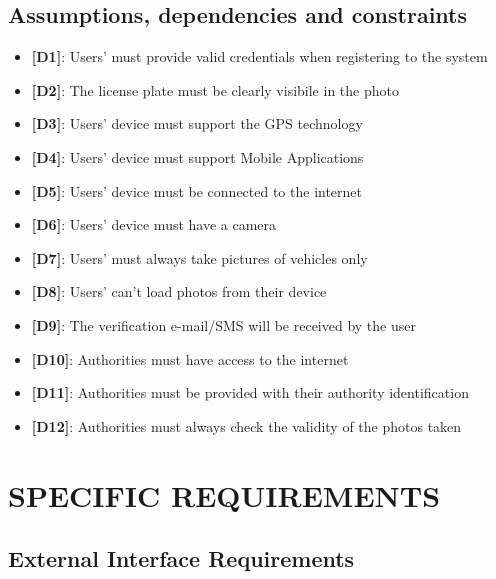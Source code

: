\documentclass[12pt,a4paper]{article}
\begin{document}
\subsection{Assumptions, dependencies and constraints}
 \begin{itemize}
				\item {\textbf[}\textbf{D1}{\textbf]}: Users' must provide valid credentials when registering to the system
				\item {\textbf[}\textbf{D2}{\textbf]}: The license plate must be clearly visibile in the photo
				\item {\textbf[}\textbf{D3}{\textbf]}: Users' device must support the GPS technology
				\item {\textbf[}\textbf{D4}{\textbf]}: Users' device must support Mobile Applications
				\item {\textbf[}\textbf{D5}{\textbf]}: Users' device must be connected to the internet
				\item {\textbf[}\textbf{D6}{\textbf]}: Users' device must have a camera
				\item {\textbf[}\textbf{D7}{\textbf]}: Users' must always take pictures of vehicles only
				\item {\textbf[}\textbf{D8}{\textbf]}: Users' can't load photos from their device 
				\item {\textbf[}\textbf{D9}{\textbf]}: The verification e-mail/SMS will be received by the user 	
				\item {\textbf[}\textbf{D10}{\textbf]}: Authorities must have access to the internet
				\item {\textbf[}\textbf{D11}{\textbf]}: Authorities must be provided with their authority identification
				\item {\textbf[}\textbf{D12}{\textbf]}: Authorities must always check the validity of the photos taken
			\end{itemize}

\newpage

\section{SPECIFIC REQUIREMENTS}
\subsection{External Interface Requirements} 
\end{document}
